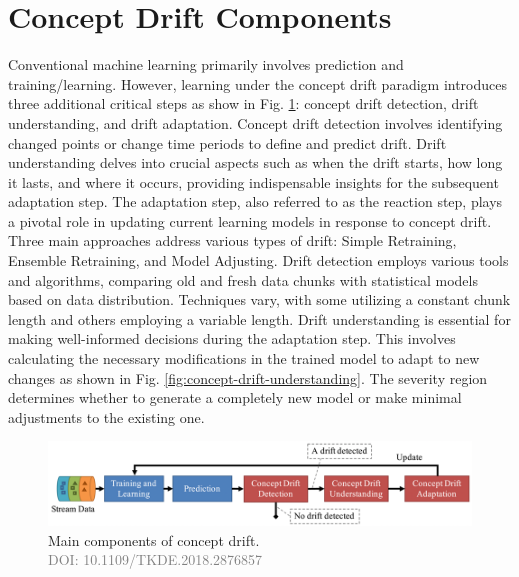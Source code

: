  \section{Concept Drift Components}
\label{sec:background_concept_drift_components}
Conventional machine learning primarily involves prediction and training/learning. However, learning under the concept drift paradigm introduces three additional critical steps as show in Fig. \ref{fig:concept-drift-components}: concept drift detection, drift understanding, and drift adaptation. Concept drift detection involves identifying changed points or change time periods to define and predict drift. Drift understanding delves into crucial aspects such as when the drift starts, how long it lasts, and where it occurs, providing indispensable insights for the subsequent adaptation step.  
The adaptation step, also referred to as the reaction step, plays a pivotal role in updating current learning models in response to concept drift. Three main approaches address various types of drift: Simple Retraining, Ensemble Retraining, and Model Adjusting. Drift detection employs various tools and algorithms, comparing old and fresh data chunks with statistical models based on data distribution. Techniques vary, with some utilizing a constant chunk length and others employing a variable length.
Drift understanding is essential for making well-informed decisions during the adaptation step. This involves calculating the necessary modifications in the trained model to adapt to new changes as shown in Fig. \ref{fig:concept-drift-understanding}. The severity region determines whether to generate a completely new model or make minimal adjustments to the existing one.

 
\begin{figure}[!ht]
    \centering
    \includegraphics[width=.9\textwidth]{2_Background/figures/concept_drift_components.png}
    \caption{Main components of concept drift. \\ \textcolor{gray}{\fontsize{10}{0}\selectfont DOI: 10.1109/TKDE.2018.2876857}}

    \label{fig:concept-drift-components}
\end{figure}


